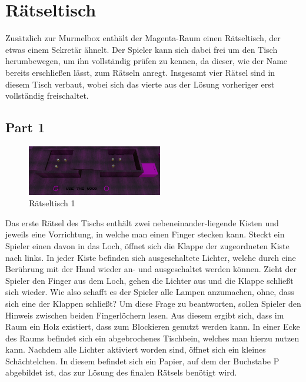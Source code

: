 \section{Rätseltisch}
Zusätzlich zur Murmelbox enthält der Magenta-Raum einen Rätseltisch, der etwas einem Sekretär ähnelt. Der Spieler kann sich dabei frei um den Tisch herumbewegen, um ihn vollständig prüfen zu kennen, da dieser, wie der Name bereits erschließen lässt, zum Rätseln anregt. Insgesamt vier Rätsel sind in diesem Tisch verbaut, wobei sich das vierte aus der Lösung vorheriger erst vollständig freischaltet.
\subsection{Part 1}
\begin{figure}
	\vspace*{-0.5cm}
	\includegraphics[width=5.9cm]{Pictures/Tisch1}
	\caption{Rätseltisch 1}
	\vspace*{-0.5cm}
	\label{fig:tisch1}
\end{figure}
Das erste Rätsel des Tischs enthält zwei nebeneinander-liegende Kisten und jeweils eine Vorrichtung, in welche man einen Finger stecken kann. Steckt ein Spieler einen davon in das Loch, öffnet sich die Klappe der zugeordneten Kiste nach links. In jeder Kiste befinden sich ausgeschaltete Lichter, welche durch eine Berührung mit der Hand wieder an- und ausgeschaltet werden können. Zieht der Spieler den Finger aus dem Loch, gehen die Lichter aus und die Klappe schließt sich wieder. Wie also schafft es der Spieler alle Lampen anzumachen, ohne, dass sich eine der Klappen schließt? Um diese Frage zu beantworten, sollen Spieler den Hinweis zwischen beiden Fingerlöchern lesen. Aus diesem ergibt sich, dass im Raum ein Holz existiert, dass zum Blockieren genutzt werden kann. In einer Ecke des Raums befindet sich ein abgebrochenes Tischbein, welches man hierzu nutzen kann. Nachdem alle Lichter aktiviert worden sind, öffnet sich ein kleines Schächtelchen. In diesem befindet sich ein Papier, auf dem der Buchstabe P abgebildet ist, das zur Lösung des finalen Rätsels benötigt wird. 
